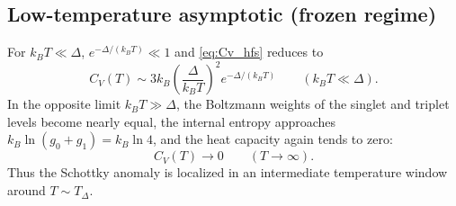 \documentclass[11pt,a4paper]{article}
\begin{document}
    \subsection{Low-temperature asymptotic (frozen regime)}
        For $k_B T\ll \Delta$, $e^{-\Delta/(k_B T)}\ll 1$ and \eqref{eq:Cv_hfs} reduces to
        \begin{equation}
            \boxed{
                C_V(T)\sim
                3k_B\left(\frac{\Delta}{k_B T}\right)^2 e^{-\Delta/(k_B T)}
                \qquad (k_B T\ll \Delta).
            }
            \label{eq:Cv_lowT}
        \end{equation}
        In the opposite limit $k_B T\gg \Delta$, the Boltzmann weights of the singlet and triplet levels become nearly equal,
        the internal entropy approaches $k_B\ln(g_0+g_1)=k_B\ln 4$, and the heat capacity again tends to zero:
        \begin{equation}
            C_V(T)\to 0 \qquad (T\to\infty).
        \end{equation}
        Thus the Schottky anomaly is localized in an intermediate temperature window around $T\sim T_\Delta$.
    
\end{document}

